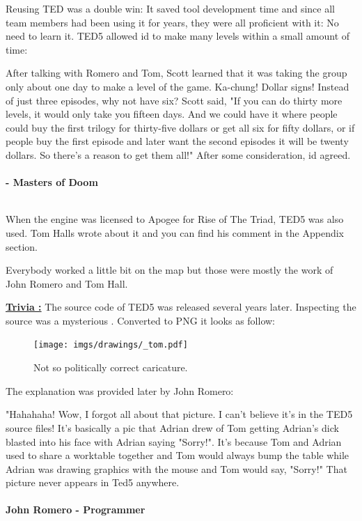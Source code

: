 \documentclass[book.tex]{subfiles}
\begin{document}
Reusing TED was a double win: It saved tool development time and since all team members had been using it for years, they were all proficient with it: No need to learn it. TED5 allowed id to make many levels within a small amount of time:\\
\par

 \begin{fancyquotes}
After talking with Romero and Tom, Scott learned that it was taking the group only about one day to make a level of the game. Ka-chung! Dollar signs! Instead of just three episodes, why not have six? Scott said, "If you can do thirty more levels, it would only take you fifteen days. And we could have it where people could buy the first trilogy for thirty-five dollars or get all six for fifty dollars, or if people buy the first episode and later want the second episodes it will be twenty dollars. So there’s a reason to get them all!" After some consideration, id agreed.\\
\\
 \textbf{- Masters of Doom}
 \end{fancyquotes}\\

 When the engine was licensed to Apogee for Rise of The Triad, TED5 was also used. Tom Halls wrote about it and you can find his comment in the Appendix section.\\
\par
Everybody worked a little bit on the map but those were mostly the work of John Romero and Tom Hall.\\
\par
 \textbf{\underline{Trivia :}} The source code of TED5 was released several years later. Inspecting the source was a mysterious . Converted to PNG it looks as follow:\\
\begin{figure}[H]
\centering
 \texttt{[image: imgs/drawings/\_tom.pdf]}
 \caption{Not so politically correct caricature.} 
 \end{figure}
The explanation was provided later by John Romero:\\
 \begin{fancyquotes}
   "Hahahaha! Wow, I forgot all about that picture. I can't believe it's 
in the TED5 source files! It's basically a pic that Adrian drew of Tom 
getting Adrian's dick blasted into his face with Adrian saying "Sorry!". 
It's because Tom and Adrian used to share a worktable together and Tom 
would always bump the table while Adrian was drawing graphics with the 
mouse and Tom would say, "Sorry!" That picture never appears in Ted5 
anywhere.\\
   \\
\textbf{John Romero - Programmer}
 \end{fancyquotes}\\
\end{document}
